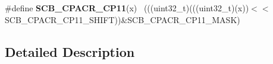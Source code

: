 \begin{DoxyCompactItemize}
\item 
\hypertarget{group___s_c_b___register___masks_ga93e602585908c311b3385b9d89c58cd0}{}\#define {\bfseries S\+C\+B\+\_\+\+C\+P\+A\+C\+R\+\_\+\+C\+P11}(x)                                            ~(((uint32\+\_\+t)(((uint32\+\_\+t)(x))$<$$<$S\+C\+B\+\_\+\+C\+P\+A\+C\+R\+\_\+\+C\+P11\+\_\+\+S\+H\+I\+F\+T))\&S\+C\+B\+\_\+\+C\+P\+A\+C\+R\+\_\+\+C\+P11\+\_\+\+M\+A\+S\+K)\label{group___s_c_b___register___masks_ga93e602585908c311b3385b9d89c58cd0}

\end{DoxyCompactItemize}


\subsection{Detailed Description}
